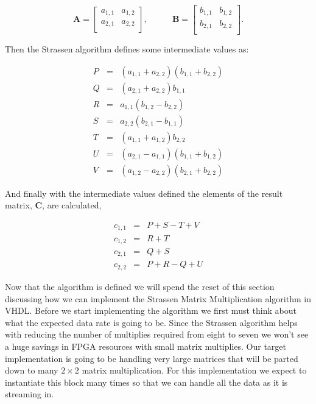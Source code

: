 \begin{equation}
\mathbf{A}=
\begin{bmatrix}
  a_{1,1} & a_{1,2} \\
  a_{2,1} & a_{2,2} \\
 \end{bmatrix},~~~~~~~~~~~~~
\mathbf{B}=
\begin{bmatrix}
  b_{1,1} & b_{1,2} \\
  b_{2,1} & b_{2,2} \\
 \end{bmatrix}.
\end{equation}

Then the Strassen algorithm defines some intermediate values as:

\begin{eqnarray}
\label{eq:capp}
P &=& (a_{1,1} + a_{2,2})(b_{1,1} + b_{2,2})\\
Q &=& (a_{2,1} + a_{2,2})b_{1,1}          \\
R &=& a_{1,1}(b_{1,2} - b_{2,2})\\
S &=& a_{2,2}(b_{2,1} - b_{1,1})\\
T &=& (a_{1,1} + a_{1,2})b_{2,2}  \\        
U &=& (a_{2,1} - a_{1,1})(b_{1,1} + b_{1,2})\\
V &=& (a_{1,2} - a_{2,2})(b_{2,1} + b_{2,2})
\label{eq:capv}
\end{eqnarray}

And finally with the intermediate values defined the elements of the result matrix, $\mathbf{C}$, are calculated,

\begin{eqnarray}
c_{1,1} &=& P + S - T + V\\
c_{1,2} &=& R + T\\
c_{2,1} &=& Q + S\\
c_{2,2} &=& P + R - Q + U
\label{eq:couts}
\end{eqnarray}

Now that the algorithm is defined we will spend the reset of this section discussing how we can implement the Strassen Matrix Multiplication algorithm in \ac{VHDL}. Before we start implementing the algorithm we first must think about what the expected data rate is going to be. Since the Strassen algorithm helps with reducing the number of multiplies required from eight to seven we won't see a huge savings in \ac{FPGA} resources with small matrix multiplies. Our target implementation is going to be handling very large matrices that will be parted down to many $2 \times 2$ matrix multiplication. For this implementation we expect to instantiate this block many times so that we can handle all the data as it is streaming in. 

